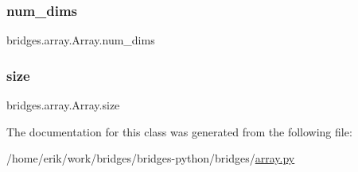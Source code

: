\subsubsection{\texorpdfstring{num\+\_\+dims}{num\_dims}}
{\footnotesize\ttfamily bridges.\+array.\+Array.\+num\+\_\+dims}

\mbox{\label{classbridges_1_1array_1_1_array_aeac1b1639d0284500f354d41b40c38f7}} 
\subsubsection{\texorpdfstring{size}{size}}
{\footnotesize\ttfamily bridges.\+array.\+Array.\+size}



The documentation for this class was generated from the following file\+:\begin{DoxyCompactItemize}
\item 
/home/erik/work/bridges/bridges-\/python/bridges/\hyperlink{array_8py}{array.\+py}\end{DoxyCompactItemize}
